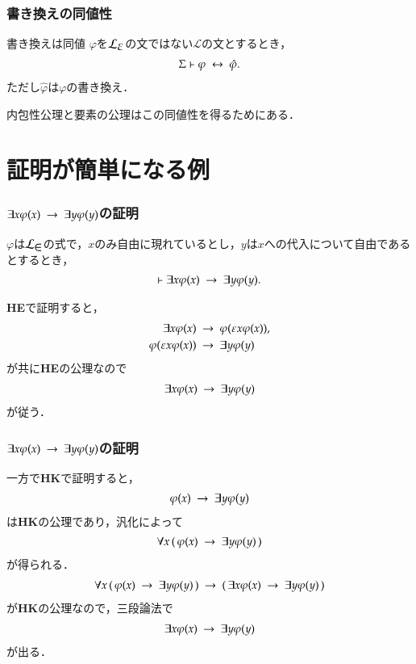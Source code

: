 \documentclass[dvipdfmx,10pt,notheorems]{beamer}
\theoremstyle{definition}
\newcommand{\lang}[1]{\mathcal{L}_{\scalebox{1.2}{$#1$}}} %
\newcommand{\rarrow}{\hspace{0.25em}\rightarrow\hspace{0.25em}} %
\newcommand{\lrarrow}{\hspace{0.25em}\leftrightarrow\hspace{0.25em}} %
\begin{document}
\begin{frame}\frametitle{書き換えの同値性}
	\begin{block}{書き換えは同値}
		$\varphi$を$\lang{\varepsilon}$の文ではない$\mathcal{L}$の文とするとき，
		\begin{align}
			\Sigma \vdash \varphi \lrarrow \hat{\varphi}.
		\end{align}
		ただし$\hat{\varphi}$は$\varphi$の書き換え．
	\end{block}
	
	内包性公理と要素の公理はこの同値性を得るためにある．
	
\end{frame}

\section{証明が簡単になる例}
\begin{frame}\frametitle{$\exists x \varphi(x) \rarrow \exists y \varphi(y)$の証明}
	\begin{block}{}
		$\varphi$は$\lang{\in}$の式で，$x$のみ自由に現れているとし，$y$は$x$への代入について自由であるとするとき，
		\begin{align}
			\vdash \exists x \varphi(x) \rarrow \exists y \varphi(y).
		\end{align}
	\end{block}
	{\bf HE}で証明すると，
	\begin{align}
		\exists x \varphi(x) &\rarrow \varphi(\varepsilon x \varphi(x)), \\
		\varphi(\varepsilon x \varphi(x)) &\rarrow \exists y \varphi(y)
	\end{align}
	が共に{\bf HE}の公理なので
	\begin{align}
		\exists x \varphi(x) \rarrow \exists y \varphi(y)
	\end{align}
	が従う．
\end{frame}

\begin{frame}\frametitle{$\exists x \varphi(x) \rarrow \exists y \varphi(y)$の証明}
	一方で{\bf HK}で証明すると，
	\begin{align}
		\varphi(x) \rarrow \exists y \varphi(y)
	\end{align}
	は{\bf HK}の公理であり，汎化によって
	\begin{align}
		\forall x\, (\, \varphi(x) \rarrow \exists y \varphi(y)\, )
	\end{align}
	が得られる．
	\begin{align}
		\forall x\, (\, \varphi(x) \rarrow \exists y \varphi(y)\, ) \rarrow 
		(\, \exists x \varphi(x) \rarrow \exists y \varphi(y)\, )
	\end{align}
	が{\bf HK}の公理なので，三段論法で
	\begin{align}
		\exists x \varphi(x) \rarrow \exists y \varphi(y)
	\end{align}
	が出る．
\end{frame}
\end{document}
